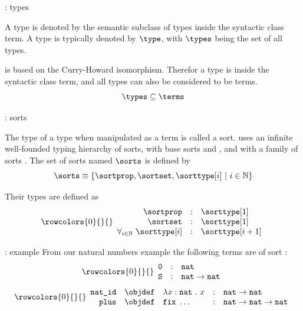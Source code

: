 \begin{frame}{\pcic: types}

	\begin{definition}[type]
		A type is denoted by the semantic subclass of types inside the syntactic class term.
		A type is typically denoted by $\type$, with $\types$ being the set of all types.
	\end{definition}
	\bigskip
	\begin{lemma}
	\coq is based on the Curry-Howard isomorphism.
	Therefor a type is inside the syntactic class term, and all types can also be considered to be terms.
	\[ \types \subseteq \terms \]
	\end{lemma}
\end{frame}

\begin{frame}{\pcic: sorts}
	\begin{definition}[sort]
		The type of a type when manipulated as a term is called a sort.
		\pcic uses an infinite well-founded typing hierarchy of sorts,
		with base sorts \sortprop and \sortset,
		and with a family of sorts \sorttype[{i}].
		The set of sorts named $\sorts$ is defined by
		\[\sorts \equiv \{ \sortprop, \sortset, \sorttype[{i}] ~|~ i \in \mathbb{N} \} \]
	
		Their types are defined as
		\[
			\rowcolors{0}{}{}
			\begin{array}{rcl}
				\sortprop & : & \sorttype[1] \\
				\sortset & : & \sorttype[1] \\
				\forall_{i \in \mathbb{N}}~ \sorttype[i] & : & \sorttype[{i+1}]
			\end{array}
		\]
	\end{definition}
\end{frame}

\begin{frame}{\pcic: example}
From our natural numbers example the following terms are of sort \sortset:
$$
	\rowcolors{0}{}{}
	\begin{array}{rcl}
		\texttt{0} & : & \texttt{nat} \\
		\texttt{S} & : & \texttt{nat} \rightarrow \texttt{nat}
	\end{array}
$$
$$
	\rowcolors{0}{}{}
	\begin{array}{rclcl}
		\texttt{nat\_id} & \objdef & \lambda x : \texttt{nat}~.~x & : & \texttt{nat} \rightarrow \texttt{nat} \\
		\texttt{plus} & \objdef & \texttt{fix}~\ldots & : & \texttt{nat} \rightarrow \texttt{nat} \rightarrow \texttt{nat} \\
	\end{array}
$$
\end{frame}

